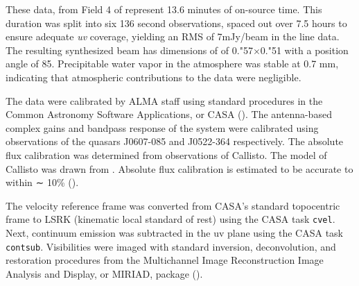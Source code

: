 


These data, from Field 4 of \citet{Mann2014} represent 13.6 minutes of on-source time. This duration was split into six 136 second observations, spaced out over 7.5 hours to ensure adequate \textit{uv} coverage, yielding an RMS of 7mJy/beam in the line data. The resulting synthesized beam has dimensions of of 0."57$\times$0."51 with a position angle of 85\degree. Precipitable water vapor in the atmosphere was stable at 0.7 mm, indicating that atmospheric contributions to the data were negligible.


The data were calibrated by ALMA staff using standard procedures in the Common Astronomy Software Applications, or CASA (\cite{McMullin2007}). The antenna-based complex gains and bandpass response of the system were calibrated using observations of the quasars J0607-085 and J0522-364 respectively. The absolute flux calibration was determined from observations of Callisto. The model of Callisto was drawn from \cite{Butler2012}. Absolute flux calibration is estimated to be accurate to within ∼ 10\% (\citet{mann_alma_2014}).

The velocity reference frame was converted from CASA's standard topocentric frame to LSRK (kinematic local standard of rest) using the CASA task \texttt{cvel}. Next, continuum emission was subtracted in the uv plane using the CASA task \texttt{contsub}. Visibilities were imaged with standard inversion, deconvolution, and restoration procedures from the Multichannel Image Reconstruction Image Analysis and Display, or MIRIAD, package (\citep{Sault1995}).





